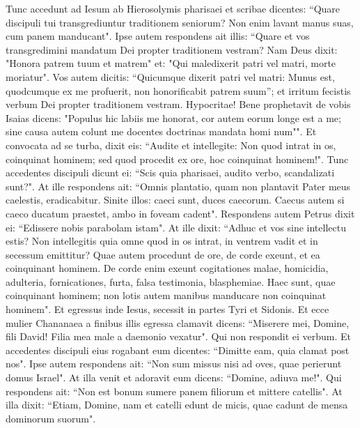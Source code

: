 \begin{biblechapter}  
\verse Tunc accedunt ad Iesum ab Hierosolymis pharisaei et scribae dicentes:  
\verse “Quare discipuli tui transgrediuntur traditionem seniorum? Non enim lavant manus suas, cum panem manducant". 
\verse Ipse autem respondens ait illis: “Quare et vos transgredimini mandatum Dei propter traditionem vestram? 
\verse Nam Deus dixit: "Honora patrem tuum et matrem" et: "Qui maledixerit patri vel matri, morte moriatur". 
\verse Vos autem dicitis: “Quicumque dixerit patri vel matri: Munus est, quodcumque ex me profuerit, 
\verse non honorificabit patrem suum”; et irritum fecistis verbum Dei propter traditionem vestram. 
\verse Hypocritae! Bene prophetavit de vobis Isaias dicens: 
\verse "Populus hic labiis me honorat, cor autem eorum longe est a me; 
\verse sine causa autem colunt me docentes doctrinas mandata homi num"". 
\verse Et convocata ad se turba, dixit eis: “Audite et intellegite: 
\verse Non quod intrat in os, coinquinat hominem; sed quod procedit ex ore, hoc coinquinat hominem!". 
\verse Tunc accedentes discipuli dicunt ei: “Scis quia pharisaei, audito verbo, scandalizati sunt?". 
\verse At ille respondens ait: “Omnis plantatio, quam non plantavit Pater meus caelestis, eradicabitur. 
\verse Sinite illos: caeci sunt, duces caecorum. Caecus autem si caeco ducatum praestet, ambo in foveam cadent".  
\verse Respondens autem Petrus dixit ei: “Edissere nobis parabolam istam". 
\verse At ille dixit: “Adhuc et vos sine intellectu estis? 
\verse Non intellegitis quia omne quod in os intrat, in ventrem vadit et in secessum emittitur? 
\verse Quae autem procedunt de ore, de corde exeunt, et ea coinquinant hominem. 
\verse De corde enim exeunt cogitationes malae, homicidia, adulteria, fornicationes, furta, falsa testimonia, blasphemiae. 
\verse Haec sunt, quae coinquinant hominem; non lotis autem manibus manducare non coinquinat hominem". 
\verse Et egressus inde Iesus, secessit in partes Tyri et Sidonis. 
\verse Et ecce mulier Chananaea a finibus illis egressa clamavit dicens: “Miserere mei, Domine, fili David! Filia mea male a daemonio vexatur". 
\verse Qui non respondit ei verbum. Et accedentes discipuli eius rogabant eum dicentes: “Dimitte eam, quia clamat post nos". 
\verse Ipse autem respondens ait: “Non sum missus nisi ad oves, quae perierunt domus Israel". 
\verse At illa venit et adoravit eum dicens: “Domine, adiuva me!". 
\verse Qui respondens ait: “Non est bonum sumere panem filiorum et mittere catellis". 
\verse At illa dixit: “Etiam, Domine, nam et catelli edunt de micis, quae cadunt de mensa dominorum suorum". 

\end{biblechapter}
